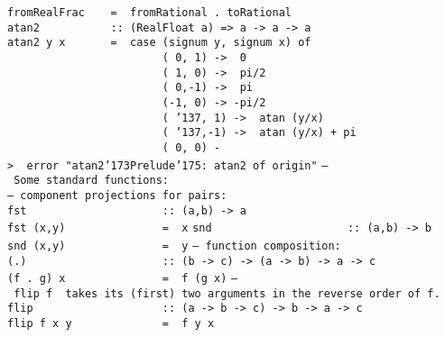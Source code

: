 \mbox{\tt fromRealFrac\ \ \ \ =\ \ fromRational\ .\ toRational}
%
\eprogB\noindent\bprogB
\mbox{\tt atan2\ \ \ \ \ \ \ \ \ \ \ ::\ (RealFloat\ a)\ =>\ a\ ->\ a\ ->\ a}\\
\mbox{\tt atan2\ y\ x\ \ \ \ \ \ \ =\ \ case\ (signum\ y,\ signum\ x)\ of}\\
\mbox{\tt \ \ \ \ \ \ \ \ \ \ \ \ \ \ \ \ \ \ \ \ \ \ \ \ (\ 0,\ 1)\ ->\ \ 0}\\
\mbox{\tt \ \ \ \ \ \ \ \ \ \ \ \ \ \ \ \ \ \ \ \ \ \ \ \ (\ 1,\ 0)\ ->\ \ pi/2}\\
\mbox{\tt \ \ \ \ \ \ \ \ \ \ \ \ \ \ \ \ \ \ \ \ \ \ \ \ (\ 0,-1)\ ->\ \ pi}\\
\mbox{\tt \ \ \ \ \ \ \ \ \ \ \ \ \ \ \ \ \ \ \ \ \ \ \ \ (-1,\ 0)\ ->\ -pi/2}\\
\mbox{\tt \ \ \ \ \ \ \ \ \ \ \ \ \ \ \ \ \ \ \ \ \ \ \ \ (\ {\char'137},\ 1)\ ->\ \ atan\ (y/x)}\\
\mbox{\tt \ \ \ \ \ \ \ \ \ \ \ \ \ \ \ \ \ \ \ \ \ \ \ \ (\ {\char'137},-1)\ ->\ \ atan\ (y/x)\ +\ pi}\\
\mbox{\tt \ \ \ \ \ \ \ \ \ \ \ \ \ \ \ \ \ \ \ \ \ \ \ \ (\ 0,\ 0)\ ->\ \ error\ "atan2{\char'173}Prelude{\char'175}:\ atan2\ of\ origin"}
%
\eprogB\noindent\bprogB
\mbox{\tt --\ Some\ standard\ functions:}\\
\mbox{\tt --\ component\ projections\ for\ pairs:}\\
\mbox{\tt fst\ \ \ \ \ \ \ \ \ \ \ \ \ \ \ \ \ \ \ \ \ ::\ (a,b)\ ->\ a}\\
\mbox{\tt fst\ (x,y)\ \ \ \ \ \ \ \ \ \ \ \ \ \ \ =\ \ x}
%
\eprogB\noindent\bprogB
\mbox{\tt snd\ \ \ \ \ \ \ \ \ \ \ \ \ \ \ \ \ \ \ \ \ ::\ (a,b)\ ->\ b}\\
\mbox{\tt snd\ (x,y)\ \ \ \ \ \ \ \ \ \ \ \ \ \ \ =\ \ y}
%
\eprogB\noindent\bprogB
\mbox{\tt --\ function\ composition:}\\
\mbox{\tt (.)\ \ \ \ \ \ \ \ \ \ \ \ \ \ \ \ \ \ \ \ \ ::\ (b\ ->\ c)\ ->\ (a\ ->\ b)\ ->\ a\ ->\ c}\\
\mbox{\tt (f\ .\ g)\ x\ \ \ \ \ \ \ \ \ \ \ \ \ \ \ =\ \ f\ (g\ x)}
%
\eprogB\noindent\bprogB
\mbox{\tt --\ flip\ f\ \ takes\ its\ (first)\ two\ arguments\ in\ the\ reverse\ order\ of\ f.}\\
\mbox{\tt flip\ \ \ \ \ \ \ \ \ \ \ \ \ \ \ \ \ \ \ \ ::\ (a\ ->\ b\ ->\ c)\ ->\ b\ ->\ a\ ->\ c}\\
\mbox{\tt flip\ f\ x\ y\ \ \ \ \ \ \ \ \ \ \ \ \ \ =\ \ f\ y\ x}
%
\eprogB\noindent\bprogB
